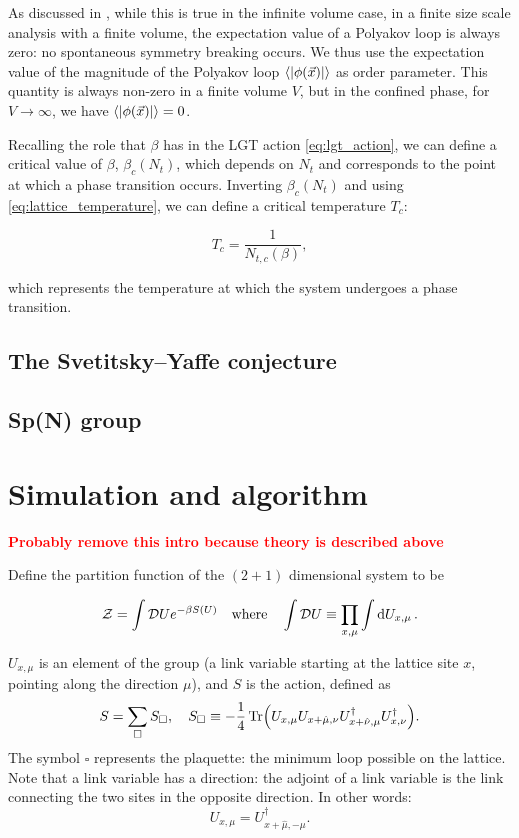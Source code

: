 \documentclass[reqno,12pt]{article}
\numberwithin{equation}{section}
\newcommand{\red}[1]{\textbf{\textcolor{red}{#1}}}
\begin{document}
As discussed in \cite{pepe}, while this is true in the infinite volume case, in a finite size scale analysis with a finite volume, 
the expectation value of a Polyakov loop is always zero: no spontaneous symmetry breaking occurs. We thus use the expectation
value of the magnitude of the Polyakov loop $\expval{|\phi(\vec{x})|}$ as order parameter. This quantity is always non-zero in a finite
volume $V$, but in the confined phase, for $V \rightarrow \infty$, we have $\expval{|\phi(\vec{x})|} = 0$.

Recalling the role that $\beta$ has in the LGT action \eqref{eq:lgt_action}, we can define a critical value of $\beta$, 
$\beta_c(N_t)$, which depends on $N_t$ and corresponds to the point at which a phase transition occurs. Inverting $\beta_c(N_t)$ and
using \eqref{eq:lattice_temperature}, we can define a critical temperature $T_c$:

\begin{equation}
	T_c = \frac{1}{N_{t,c}(\beta)},
\end{equation}

which represents the temperature at which the system undergoes a phase transition.

\subsection{The Svetitsky–Yaffe conjecture}

\subsection{Sp(N) group}

\section{Simulation and algorithm}
\red{Probably remove this intro because theory is described above}

Define the partition function of the $(2+1)$ dimensional system to be

\begin{equation}
	\mathcal{Z} = \int \mathcal{D}U e^{-\beta S(U)} \qq{where} \int \mathcal{D} U \equiv \prod_{x,\mu} \int \dd{U_{x,\mu}}.
\end{equation}

$U_{x,\mu}$ is an element of the group (a link variable starting at the lattice site $x$, pointing
along the direction $\mu$), 
and $S$ is the action, defined as
\begin{equation}
	S = \sum_\square S_\square \qc 
	S_\square \equiv - \frac{1}{4} \Tr(U_{x,\mu}U_{x+\hat{\mu}, \nu}U^\dagger_{x+\hat{\nu}, \mu}U^\dagger_{x,\nu}).
\end{equation}
The symbol $\square$ represents the plaquette: the minimum loop possible on the lattice. Note that a link 
variable has a direction: the adjoint of a link variable is the link connecting the two sites in the opposite
direction. In other words:
\begin{equation}
	U_{x,\mu} = U_{x+\hat{\mu}, -\mu}^\dagger.
\end{equation}
\end{document}

